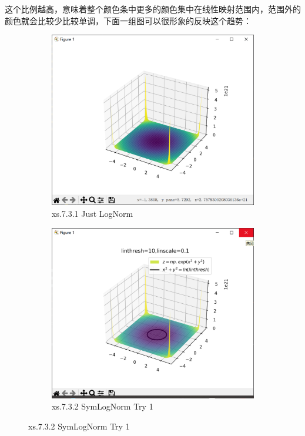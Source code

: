 \documentclass[12pt]{article}
\begin{document}
这个比例越高，意味着整个颜色条中更多的颜色集中在线性映射范围内，范围外的颜色就会比较少比较单调，下面一组图可以很形象的反映这个趋势：
\begin{figure}[H]
    \centering
    \begin{subfigure}[b]{0.48\textwidth}
        \includegraphics[width=\textwidth]{norm PIc1.png} %
        \caption{xs.7.3.1 Just LogNorm}
        \label{fig:line-graph2}
    \end{subfigure}
    \hfill
    \begin{subfigure}[b]{0.48\textwidth}
        \includegraphics[width=\textwidth]{norm PIc2.1.png} %
        \caption{xs.7.3.2 SymLogNorm Try 1}
        \label{fig:line-graph2-pic2}
    \end{subfigure}
\end{figure}
\end{document}
